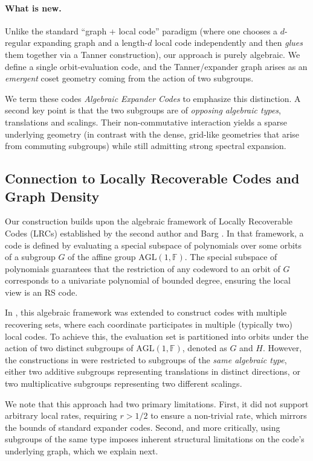 \documentclass[11pt]{article}
\theoremstyle{plain}
\theoremstyle{definition}
\begin{document}
\paragraph{What is new.}
Unlike the standard “graph + local code” paradigm (where one chooses a $d$-regular expanding graph and a length-$d$ local code independently and then \emph{glues} them together via a Tanner construction), our approach is purely algebraic.
We define a single orbit-evaluation code, and the Tanner/expander graph arises as an \emph{emergent} coset geometry coming from the action of two subgroups.

We term these codes \emph{Algebraic Expander Codes} to emphasize this distinction.
A second key point is that the two subgroups are of \emph{opposing algebraic types}, translations and scalings.
Their non-commutative interaction yields a sparse underlying geometry (in contrast with the dense, grid-like geometries that arise from commuting subgroups) while still admitting strong spectral expansion.

\subsection{Connection to Locally Recoverable Codes and Graph Density}
\label{sec:connection-to-LRC}
Our construction builds upon the algebraic framework of Locally Recoverable Codes (LRCs) established by the second author and Barg \cite{tamo2014family}. In that framework, a code is defined by evaluating a special subspace of polynomials over some orbits of a subgroup $G$ of the affine group $\mathrm{AGL}(1,\mathbb{F})$. The special subspace of polynomials guarantees that the restriction of any codeword to an orbit of $G$ corresponds to a univariate polynomial of bounded degree, ensuring the local view is an RS code.

In \cite{tamo2014family}, this algebraic framework was extended to construct codes with multiple recovering sets, where each coordinate participates in multiple (typically two) local codes. To achieve this, the evaluation set is partitioned into orbits under the action of two distinct subgroups of $\mathrm{AGL}(1,\mathbb{F})$, denoted as $G$ and $H$. However, the constructions in \cite{tamo2014family} were restricted to subgroups of the \emph{same algebraic type}, either two additive subgroups representing translations in distinct directions, or two multiplicative subgroups representing two different scalings.

We note that this approach had two primary limitations. First, it did not support arbitrary local rates, requiring $r > 1/2$ to ensure a non-trivial rate, which mirrors the bounds of standard expander codes. Second, and more critically, using subgroups of the same type imposes inherent structural limitations on the code's underlying graph, which we explain next.
\end{document}
